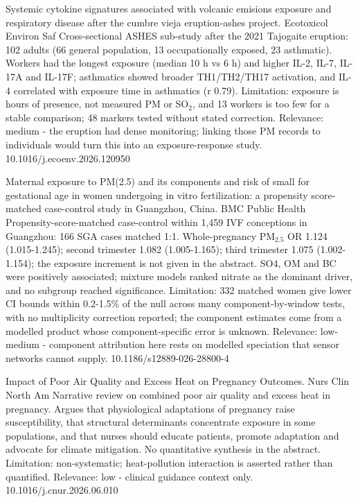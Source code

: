 \documentclass[10pt]{article}
\begin{document}
{Systemic cytokine signatures associated with volcanic emisions exposure and respiratory disease after the cumbre vieja eruption-ashes project.}
{Ecotoxicol Environ Saf}
{Cross-sectional ASHES sub-study after the 2021 Tajogaite eruption: 102 adults (66 general population, 13 occupationally exposed, 23 asthmatic). Workers had the longest exposure (median 10 h vs 6 h) and higher IL-2, IL-7, IL-17A and IL-17F; asthmatics showed broader TH1/TH2/TH17 activation, and IL-4 correlated with exposure time in asthmatics (r 0.79). Limitation: exposure is hours of presence, not measured PM or SO$_2$, and 13 workers is too few for a stable comparison; 48 markers tested without stated correction. Relevance: medium - the eruption had dense monitoring; linking those PM records to individuals would turn this into an exposure-response study.}
{10.1016/j.ecoenv.2026.120950}

\par{}\baselineskip{}\baselineskip
{}

{Maternal exposure to PM(2.5) and its components and risk of small for gestational age in women undergoing in vitro fertilization: a propensity score-matched case-control study in Guangzhou, China.}
{BMC Public Health}
{Propensity-score-matched case-control within 1,459 IVF conceptions in Guangzhou: 166 SGA cases matched 1:1. Whole-pregnancy PM$_{2.5}$ OR 1.124 (1.015-1.245); second trimester 1.082 (1.005-1.165); third trimester 1.075 (1.002-1.154); the exposure increment is not given in the abstract. SO4, OM and BC were positively associated; mixture models ranked nitrate as the dominant driver, and no subgroup reached significance. Limitation: 332 matched women give lower CI bounds within 0.2-1.5\% of the null across many component-by-window tests, with no multiplicity correction reported; the component estimates come from a modelled product whose component-specific error is unknown. Relevance: low-medium - component attribution here rests on modelled speciation that sensor networks cannot supply.}
{10.1186/s12889-026-28800-4}

{Impact of Poor Air Quality and Excess Heat on Pregnancy Outcomes.}
{Nurs Clin North Am}
{Narrative review on combined poor air quality and excess heat in pregnancy. Argues that physiological adaptations of pregnancy raise susceptibility, that structural determinants concentrate exposure in some populations, and that nurses should educate patients, promote adaptation and advocate for climate mitigation. No quantitative synthesis in the abstract. Limitation: non-systematic; heat-pollution interaction is asserted rather than quantified. Relevance: low - clinical guidance context only.}
{10.1016/j.cnur.2026.06.010}
\end{document}
